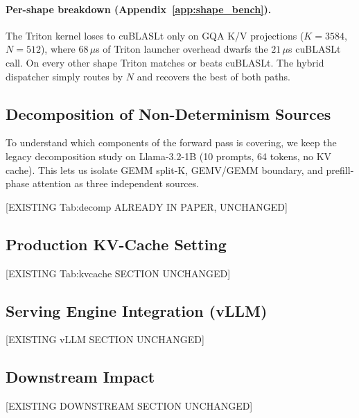 \paragraph{Per-shape breakdown (Appendix~\ref{app:shape_bench}).} The Triton
kernel loses to cuBLASLt only on GQA K/V projections ($K\!=\!3584$,
$N\!=\!512$), where $68\,\mu$s of Triton launcher overhead dwarfs the $21\,\mu$s
cuBLASLt call. On every other shape Triton matches or beats cuBLASLt. The
hybrid dispatcher simply routes by $N$ and recovers the best of both paths.

\subsection{Decomposition of Non-Determinism Sources}
\label{sec:decomp}

To understand which components of the forward pass \dllm is covering, we keep
the legacy decomposition study on Llama-3.2-1B (10 prompts, 64 tokens, no KV
cache). This lets us isolate GEMM split-K, GEMV/GEMM boundary, and
prefill-phase attention as three independent sources.

[EXISTING Tab:decomp ALREADY IN PAPER, UNCHANGED]

\subsection{Production KV-Cache Setting}
\label{sec:kvcache}

[EXISTING Tab:kvcache SECTION UNCHANGED]

\subsection{Serving Engine Integration (vLLM)}
\label{sec:vllm}

[EXISTING vLLM SECTION UNCHANGED]

\subsection{Downstream Impact}
\label{sec:downstream}

[EXISTING DOWNSTREAM SECTION UNCHANGED]
